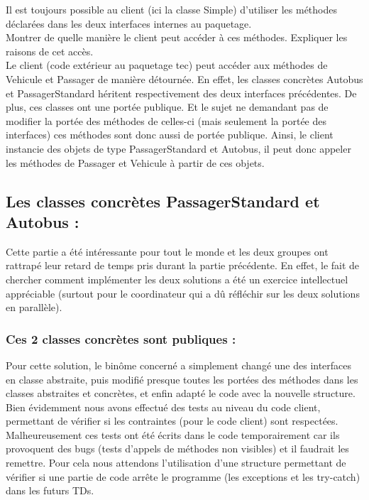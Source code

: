 \documentclass{article}
\begin{document}
Il est toujours possible au client (ici la classe Simple) d’utiliser les méthodes déclarées dans les deux interfaces internes au paquetage.\\
Montrer de quelle manière le client peut accéder à ces méthodes. Expliquer les raisons de
cet accès.\\
Le client (code extérieur au paquetage tec) peut accéder aux méthodes de Vehicule et
Passager de manière détournée. En effet, les classes concrètes Autobus et
PassagerStandard héritent respectivement des deux interfaces précédentes.
De plus, ces classes ont une portée publique. Et le sujet ne demandant pas de modifier la
portée des méthodes de celles-ci (mais seulement la portée des interfaces) ces méthodes
sont donc aussi de portée publique.
Ainsi, le client instancie des objets de type PassagerStandard et Autobus, il peut donc
appeler les méthodes de Passager et Vehicule à partir de ces objets.
\newline
\newline

\subsection{Les classes concrètes PassagerStandard et Autobus : }
Cette partie a été intéressante pour tout le monde et les deux groupes ont rattrapé leur
retard de temps pris durant la partie précédente. En effet, le fait de chercher comment
implémenter les deux solutions a été un exercice intellectuel appréciable (surtout pour le coordinateur qui a dû réfléchir sur les deux solutions en parallèle).\\
\subsubsection{Ces 2 classes concrètes sont publiques : }
Pour cette solution, le binôme concerné a simplement changé une des interfaces en classe
abstraite, puis modifié presque toutes les portées des méthodes dans les classes abstraites et concrètes, et enfin adapté le code avec la nouvelle structure.
Bien évidemment nous avons effectué des tests au niveau du code client, permettant de
vérifier si les contraintes (pour le code client) sont respectées. Malheureusement ces tests ont été écrits dans le code temporairement car ils provoquent des bugs (tests d’appels de méthodes non visibles) et il faudrait les remettre.
Pour cela nous attendons l’utilisation d’une structure permettant de vérifier si une partie de code arrête le programme (les exceptions et les try-catch) dans les futurs TDs.
\end{document}

